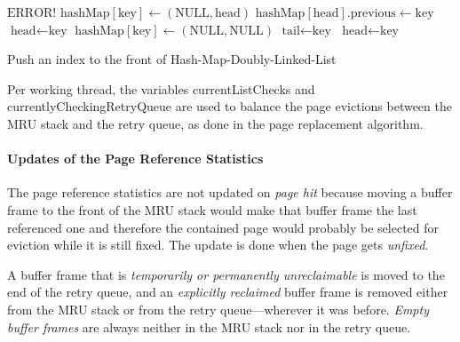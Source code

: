 \begin{@empty}
    \begin{algorithm}[h]
        \scriptsize
        \begin{algorithmic}[1]
                        \State \Return $\text{ERROR!}$
                    \EndIf
                    \State $\text{hashMap}\left[\text{key}\right] \gets \left(\text{NULL}, \text{head}\right)$
                    \State $\text{hashMap}\left[\text{head}\right].\text{previous} \gets \text{key}$
                    \State $\text{head} \gets \text{key}$
                \Else
                    \State $\text{hashMap}\left[\text{key}\right] \gets \left(\text{NULL}, \text{NULL}\right)$
                    \State $\text{tail} \gets \text{key}$
                    \State $\text{head} \gets \text{key}$
                \EndIf
            \EndFunction
        \end{algorithmic}
        \vspace{1em}
        \caption[{\footnotesize \textbf{function} \textsc{pushToFront}} of Hash-Map-Doubly-Linked-List]{Push an index to the front of Hash-Map-Doubly-Linked-List}
        \label{alg:hashmapdoublylinkedlistpushtofront}
    \end{algorithm}
\end{@empty}


    Per working thread, the variables currentListChecks and currentlyCheckingRetryQueue are used to balance the page evictions between the MRU stack and the retry queue, as done in the  page replacement algorithm.

\paragraph{Updates of the Page Reference Statistics}

    The page reference statistics are not updated on \emph{page hit} because moving a buffer frame to the front of the MRU stack would make that buffer frame the last referenced one and therefore the contained page would probably be selected for eviction while it is still fixed. The update is done when the page gets \emph{unfixed}.

    A buffer frame that is \emph{temporarily or permanently unreclaimable} is moved to the end of the retry queue, and an \emph{explicitly reclaimed} buffer frame is removed either from the MRU stack or from the retry queue---wherever it was before. \emph{Empty buffer frames} are always neither in the MRU stack nor in the retry queue.

